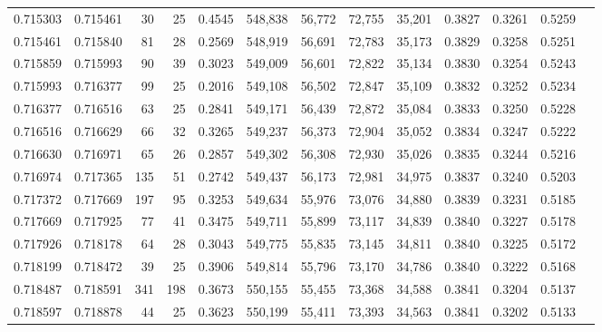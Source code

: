 \begin{tabular}{rrrrrrrrrrrrr}
0.715303 & 0.715461 &    30 &  25 &                                     0.4545 & 548,838 &  56,772 &  72,755 &  35,201 & 0.3827 & 0.3261 & 0.5259 \\
0.715461 & 0.715840 &    81 &  28 &                                     0.2569 & 548,919 &  56,691 &  72,783 &  35,173 & 0.3829 & 0.3258 & 0.5251 \\
0.715859 & 0.715993 &    90 &  39 &                                     0.3023 & 549,009 &  56,601 &  72,822 &  35,134 & 0.3830 & 0.3254 & 0.5243 \\
0.715993 & 0.716377 &    99 &  25 &                                     0.2016 & 549,108 &  56,502 &  72,847 &  35,109 & 0.3832 & 0.3252 & 0.5234 \\
0.716377 & 0.716516 &    63 &  25 &                                     0.2841 & 549,171 &  56,439 &  72,872 &  35,084 & 0.3833 & 0.3250 & 0.5228 \\
0.716516 & 0.716629 &    66 &  32 &                                     0.3265 & 549,237 &  56,373 &  72,904 &  35,052 & 0.3834 & 0.3247 & 0.5222 \\
0.716630 & 0.716971 &    65 &  26 &                                     0.2857 & 549,302 &  56,308 &  72,930 &  35,026 & 0.3835 & 0.3244 & 0.5216 \\
0.716974 & 0.717365 &   135 &  51 &                                     0.2742 & 549,437 &  56,173 &  72,981 &  34,975 & 0.3837 & 0.3240 & 0.5203 \\
0.717372 & 0.717669 &   197 &  95 &                                     0.3253 & 549,634 &  55,976 &  73,076 &  34,880 & 0.3839 & 0.3231 & 0.5185 \\
0.717669 & 0.717925 &    77 &  41 &                                     0.3475 & 549,711 &  55,899 &  73,117 &  34,839 & 0.3840 & 0.3227 & 0.5178 \\
0.717926 & 0.718178 &    64 &  28 &                                     0.3043 & 549,775 &  55,835 &  73,145 &  34,811 & 0.3840 & 0.3225 & 0.5172 \\
0.718199 & 0.718472 &    39 &  25 &                                     0.3906 & 549,814 &  55,796 &  73,170 &  34,786 & 0.3840 & 0.3222 & 0.5168 \\
0.718487 & 0.718591 &   341 & 198 &                                     0.3673 & 550,155 &  55,455 &  73,368 &  34,588 & 0.3841 & 0.3204 & 0.5137 \\
0.718597 & 0.718878 &    44 &  25 &                                     0.3623 & 550,199 &  55,411 &  73,393 &  34,563 & 0.3841 & 0.3202 & 0.5133 \\

\end{tabular}

